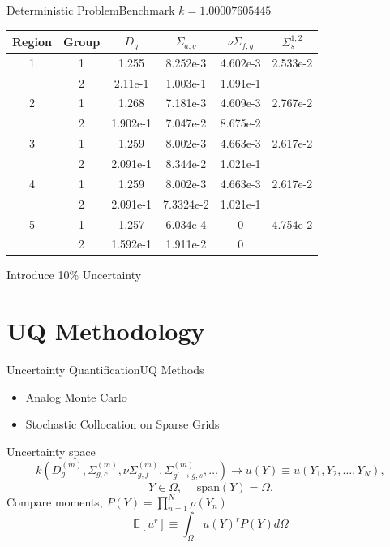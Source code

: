 \documentclass{beamer}
\newcommand{\expv}[1]{\ensuremath{\mathbb{E}[ #1]}}
\begin{document}
\begin{frame}{Deterministic Problem}{Benchmark}\vspace{-20pt}
$k=1.00007605445$
\scriptsize
\begin{table}[h]
\centering
\begin{tabular}{c c | c c c c}
Region & Group & $D_g$ & $\Sigma_{a,g}$ & $\nu\Sigma_{f,g}$ & $\Sigma_s^{1,2}$ \\ \hline
1 & 1 & 1.255 & 8.252e-3 & 4.602e-3 & 2.533e-2 \\
 & 2 & 2.11e-1 & 1.003e-1 & 1.091e-1 & \\ \hline
2 & 1 & 1.268 & 7.181e-3 & 4.609e-3 & 2.767e-2 \\
 & 2 & 1.902e-1 & 7.047e-2 & 8.675e-2 & \\ \hline
3 & 1 & 1.259 & 8.002e-3 & 4.663e-3 & 2.617e-2 \\
 & 2 & 2.091e-1 & 8.344e-2 & 1.021e-1 & \\ \hline
4 & 1 & 1.259 & 8.002e-3 & 4.663e-3 & 2.617e-2 \\
 & 2 & 2.091e-1 & 7.3324e-2 & 1.021e-1 & \\ \hline
5 & 1 & 1.257 & 6.034e-4 & 0 & 4.754e-2 \\
 & 2 & 1.592e-1 & 1.911e-2 & 0 & 
\end{tabular}
\end{table}\normalsize
Introduce 10\% Uncertainty
\end{frame}

\section{UQ Methodology}
\begin{frame}{Uncertainty Quantification}{UQ Methods}\vspace{-20pt}
\begin{itemize}
\item Analog Monte Carlo
\item Stochastic Collocation on Sparse Grids
\end{itemize}
Uncertainty space
\[k(D_g^{(m)},\Sigma_{g,c}^{(m)},\nu\Sigma_{g,f}^{(m)},\Sigma_{g'\to g,s}^{(m)},\ldots) \to u(Y)\equiv u(Y_1,Y_2,\ldots,Y_N),\]%
\[Y\in\Omega,\hspace{15pt}\text{span}(Y)=\Omega.\]
Compare moments, $P(Y)=\prod_{n=1}^N \rho(Y_n)$
\[\expv{u^r}\equiv\int_\Omega u(Y)^rP(Y)d\Omega\]
\end{frame}
\end{document}
